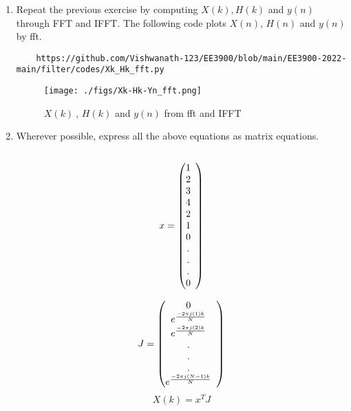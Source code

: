 \documentclass[journal,12pt,twocolumn]{IEEEtran}
\renewcommand\thesection{\arabic{section}}
\begin{document}
\begin{enumerate}[label=\thesection.\arabic*]
\item Repeat the previous exercise by computing $X(k), H(k)$ and $y(n)$ through FFT and 
IFFT.
\solution The following code plots $X(n)$, $H(n)$ and $y(n)$ by fft.
\begin{lstlisting}
    https://github.com/Vishwanath-123/EE3900/blob/main/EE3900-2022-main/filter/codes/Xk_Hk_fft.py
\end{lstlisting}

\begin{figure}[!ht]
\centering
\texttt{[image: ./figs/Xk-Hk-Yn\_fft.png]}
\caption{$X(k)~$, $H(k)$ and $y(n)$ from fft and IFFT}
\label{fig:Xk_Hk_yn}
\end{figure}

\item Wherever possible, express all the above equations as matrix equations.\\
\solution \\
\[
\begin{array}{lc}
    x = 
  \left(\begin{array}{@{}ccc@{}}
    1 \\
    2 \\
    3 \\
    4 \\
    2 \\
    1 \\
    0 \\
    . \\
    . \\
    . \\
    0 \\
  \end{array}\right) \\[15pt]
\end{array}
\]

\[
\begin{array}{lc}
    J = 
  \left(\begin{array}{@{}ccc@{}}
    0 \\
    e^{\frac{-2\pi j(1)k}{N}} \\
    e^{\frac{-2\pi j(2)k}{N}} \\
    . \\
    . \\
    . \\
    e^{\frac{-2\pi j(N-1)k}{N}} \\
  \end{array}\right) \\[15pt]
\end{array}
\]
\begin{equation}
    X(k) = x^{T} J
\end{equation}


\end{enumerate}
\end{document}
